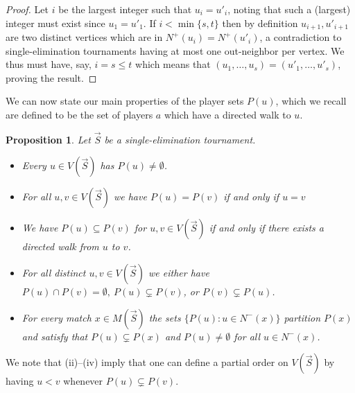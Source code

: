 \documentclass[12pt,letterpaper]{article}
\newtheorem{prop}[thm]{Proposition}
\theoremstyle{definition}
\renewcommand{\1}{\mathbbm{1}}
\newcommand{\sub}{\subseteq}
\newcommand{\tour}{\vec{S}}
\begin{document}
\begin{proof}
	Let $i$ be the largest integer such that $u_i=u'_i$, noting that such a (largest) integer must exist since $u_1=u'_1$.  If $i<\min\{s,t\}$ then by definition $u_{i+1},u'_{i+1}$ are two distinct vertices which are in $N^+(u_i)=N^+(u'_i)$, a contradiction to single-elimination tournaments having at most one out-neighbor per vertex.  We thus must have, say, $i=s\le t$ which means that $(u_1,\ldots,u_s)=(u'_1,\ldots,u'_s)$, proving the result.
\end{proof}


We can now state our main properties of the player sets $P(u)$, which we recall are defined to be the set of players $a$ which have a directed walk to $u$.
\begin{prop}\label{Pu Sets}
	Let $\tour$ be a single-elimination tournament.
	\begin{itemize}
		\item[(i)] Every $u\in V(\tour)$ has $P(u)\ne \emptyset$.
		\item[(ii)] For all $u,v\in V(\tour)$ we have $P(u)= P(v)$ if and only if $u= v$
		\item[(iii)] We have $P(u)\sub P(v)$ for $u,v\in V(\tour)$ if and only if there exists a directed walk from $u$ to $v$.
		\item[(iv)] For all distinct $u,v\in V(\tour)$ we either have $P(u)\cap P(v)=\emptyset,\ P(u)\subsetneq P(v)$, or $P(v)\subsetneq P(u)$.
		\item[(v)] For every match $x\in M(\tour)$ the sets $\{P(u):u\in N^-(x)\}$ partition $P(x)$ and satisfy that $P(u)\subsetneq P(x)$ and $P(u)\ne \emptyset$ for all $u\in N^-(x)$.
	\end{itemize}
\end{prop}
We note that (ii)--(iv) imply that one can define a partial order on $V(\tour)$ by having $u<v$ whenever $P(u)\subsetneq P(v)$.
\end{document}
